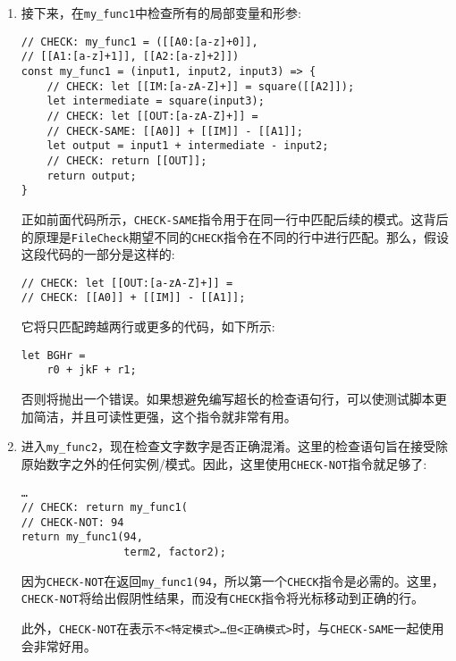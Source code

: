 \begin{enumerate}
\item 接下来，在\texttt{my\_func1}中检查所有的局部变量和形参:

\begin{lstlisting}[style=styleJavaScript]
// CHECK: my_func1 = ([[A0:[a-z]+0]],
// [[A1:[a-z]+1]], [[A2:[a-z]+2]])
const my_func1 = (input1, input2, input3) => {
	// CHECK: let [[IM:[a-zA-Z]+]] = square([[A2]]);
	let intermediate = square(input3);
	// CHECK: let [[OUT:[a-zA-Z]+]] =
	// CHECK-SAME: [[A0]] + [[IM]] - [[A1]];
	let output = input1 + intermediate - input2;
	// CHECK: return [[OUT]];
	return output;
}
\end{lstlisting}

正如前面代码所示，\texttt{CHECK-SAME}指令用于在同一行中匹配后续的模式。这背后的原理是\texttt{FileCheck}期望不同的\texttt{CHECK}指令在不同的行中进行匹配。那么，假设这段代码的一部分是这样的:

\begin{lstlisting}[style=styleJavaScript]
// CHECK: let [[OUT:[a-zA-Z]+]] =
// CHECK: [[A0]] + [[IM]] - [[A1]];
\end{lstlisting}

它将只匹配跨越两行或更多的代码，如下所示:

\begin{lstlisting}[style=styleJavaScript]
let BGHr =
	r0 + jkF + r1;
\end{lstlisting}

否则将抛出一个错误。如果想避免编写超长的检查语句行，可以使测试脚本更加简洁，并且可读性更强，这个指令就非常有用。

\item 进入\texttt{my\_func2}，现在检查文字数字是否正确混淆。这里的检查语句旨在接受除原始数字之外的任何实例/模式。因此，这里使用\texttt{CHECK-NOT}指令就足够了:

\begin{lstlisting}[style=styleJavaScript]
…
// CHECK: return my_func1(
// CHECK-NOT: 94
return my_func1(94,
				term2, factor2);
\end{lstlisting}

\begin{tcolorbox}[colback=blue!5!white,colframe=blue!75!black, fonttitle=\bfseries,title=Note]
\hspace*{0.7cm}因为\texttt{CHECK-NOT}在返回\texttt{my\_func1(94}，所以第一个\texttt{CHECK}指令是必需的。这里，\texttt{CHECK-NOT}将给出假阴性结果，而没有\texttt{CHECK}指令将光标移动到正确的行。
\end{tcolorbox}

此外，\texttt{CHECK-NOT}在表示\texttt{不<特定模式>…但<正确模式>}时，与\texttt{CHECK-SAME}一起使用会非常好用。


\end{enumerate}
